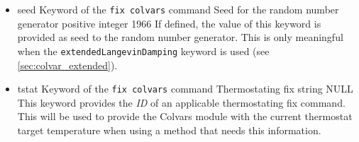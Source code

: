 {\begin{itemize}
\item %
  \keydef
    {seed}{%
    Keyword of the \texttt{fix colvars} command}{%
    Seed for the random number generator}{%
    positive integer}{%
    1966}{%
    If defined, the value of this keyword is provided as seed to the random number generator.
    This is only meaningful when the \texttt{extendedLangevinDamping} keyword is used (see \ref{sec:colvar_extended}).}

\item %
  \keydef
    {tstat}{%
    Keyword of the \texttt{fix colvars} command}{%
    Thermostating fix}{%
    string}{%
    NULL}{%
    This keyword provides the \emph{ID} of an applicable thermostating fix command. This will be used to provide the Colvars module with the current thermostat target temperature when using a method that needs this information.}

\end{itemize}

}


